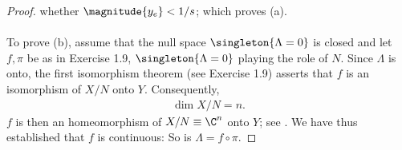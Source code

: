 \begin{proof}
%
whether $\magnitude{y_e} < 1/s$; which proves (a).\\\\
%
%
To prove (b), assume that the null space 
%
  $\singleton{\Lambda = 0}$ %
% 
is closed and let $f, \pi$ be as in Exercise 1.9,  %
%
  $\singleton{\Lambda = 0}$ %
%
playing the role of $N$.
%
Since $\Lambda$ is onto, the first isomorphism theorem (see Exercise 1.9) 
asserts that 
%
  $f$ is an isomorphism of $X/N$ onto $Y$. 
%
Consequently, 
%
  \begin{align}
    \dim X/N= n.
  \end{align}
% 
$f$ is then an homeomorphism of 
%
  $X/N\equiv \C^{n}$ 
%
onto $Y$; see .
We have thus established that $f$ is continuous: So is $\Lambda = f\circ \pi$.
\end{proof}